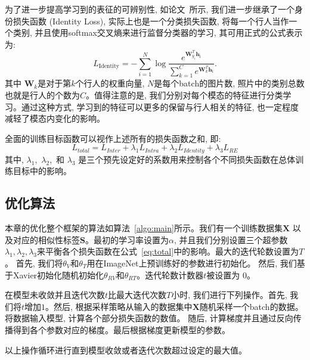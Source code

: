 为了进一步提高学习到的表征的可辨别性, 如论文~\cite{ye2018visible}所示, 我们进一步继承了一个身份损失函数 (Identity Loss), 实际上也是一个分类损失函数, 将每一个行人当作一个类别, 并且使用softmax交叉熵来进行监督分类器的学习, 其可用正式的公式表示为:
\begin{equation}
  L_{\text {Identity}}=-\sum_{i=1}^N \log \frac{e^{\mathbf{W}_{y_i}^T \mathbf{h}_{\mathrm{i}}}}{\sum_{k=1}^C e^{\mathbf{W}_k^T \mathbf{h}_{\mathrm{i}}}}.
  \label{eq:identity}
\end{equation} 
其中 $\mathbf{W}_k$是对于第$k$个行人的权重向量, $N$是每个batch的图片数, 照片中的类别总数也就是行人的个数为$C$。值得注意的是, 我们分别对每个模态的特征进行分类学习。通过这种方式, 学习到的特征可以更多的保留与行人相关的特征, 也一定程度减轻了模态内变化的影响。\par
全面的训练目标函数可以视作上述所有的损失函数之和, 即:
\begin{equation}
  L_{total} = L_{Inter}+\lambda_1L_{Intra}+\lambda_2L_{Identity} + \lambda_3L_{RE}
\label{eq:total}
\end{equation}
其中, $\lambda_1$,~$\lambda_2$,~和 $\lambda_3$ 是三个预先设定好的系数用来控制各个不同损失函数在总体训练目标中的影响。
\subsection{优化算法}
本章的优化整个框架的算法如算法~\ref{algo:main}所示。我们有一个训练数据集$\mathbf{X}$ 以及对应的相似性标签$\mathbf{S}$。最初的学习率设置为$\alpha$, 并且我们分别设置三个超参数$\lambda_1, \lambda_2, \lambda_3$来平衡各个损失函数在公式~\ref{eq:total}中的影响。最大的迭代轮数设置为$T$。 首先, 我们将$\theta_{V}$和$\theta_{T}$用在ImageNet上预训练好的参数进行初始化。 然后, 我们基于Xavier初始化随机初始化$\theta_{RV}$和$\theta_{RT}$。迭代轮数计数器$t$被设置为 $0$。 \par
在模型未收敛并且迭代次数$t$比最大迭代次数$T$小时, 我们进行下列操作。首先, 我们将$t$增加$1$。然后, 根据采样策略从输入的数据集中$\mathbf{X}$随机采样一个batch的数据。将数据输入模型, 计算各个部分损失函数的数值。
随后, 计算梯度并且通过反向传播得到各个参数对应的梯度。最后根据梯度更新模型的参数。\par
以上操作循环进行直到模型收敛或者迭代次数超过设定的最大值。


